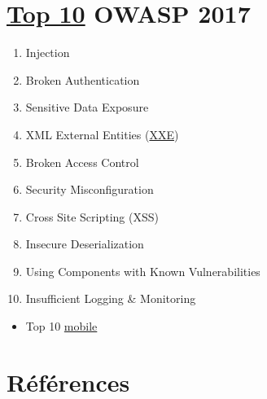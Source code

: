 \hypertarget{top-109-owasp-2017}{%
\section{\texorpdfstring{\href{https://www.owasp.org/index.php/Category:OWASP_Top_Ten_Project}{Top
10} OWASP 2017}{Top 10 OWASP 2017}}\label{top-109-owasp-2017}}

\begin{enumerate}
\def\labelenumi{\arabic{enumi}.}
\tightlist
\item
  Injection
\item
  Broken Authentication
\item
  Sensitive Data Exposure
\item
  XML External Entities
  (\href{https://www.acunetix.com/blog/articles/xml-external-entity-xxe-vulnerabilities/}{XXE})
\item
  Broken Access Control
\item
  Security Misconfiguration
\item
  Cross Site Scripting (XSS)
\item
  Insecure Deserialization
\item
  Using Components with Known Vulnerabilities
\item
  Insufficient Logging \& Monitoring
\end{enumerate}

\begin{itemize}
\tightlist
\item
  Top 10
  \href{https://www.owasp.org/index.php/Mobile_Top_10_2016-Top_10}{mobile}
\end{itemize}

\hypertarget{ruxe9fuxe9rences}{%
\section{Références}\label{ruxe9fuxe9rences}}

